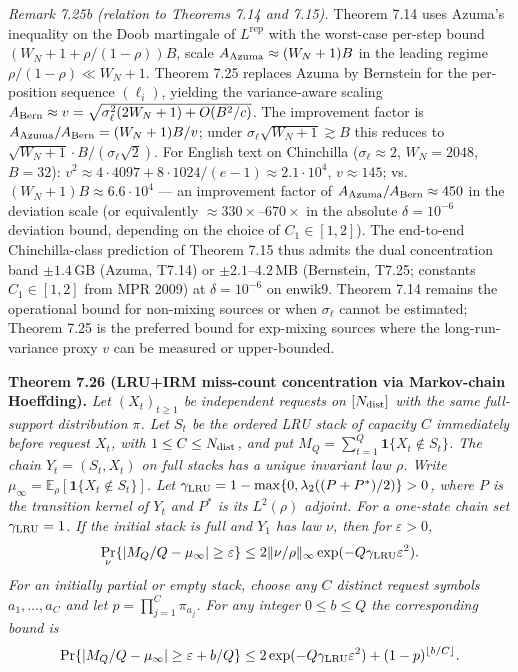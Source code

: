 \documentclass[
]{article}
\begin{document}
\emph{Remark 7.25b (relation to Theorems 7.14 and 7.15).}
Theorem 7.14 uses Azuma's inequality on the Doob martingale of
$L^{\mathrm{rep}}$ with the worst-case per-step bound
$(W_N + 1 + \rho/(1-\rho)) B$, scale $A_{\rm Azuma}
\approx (W_N+1) B$ in the leading regime $\rho/(1-\rho) \ll W_N + 1$.
Theorem 7.25 replaces Azuma by Bernstein for the per-position
sequence $(\ell_i)$, yielding the variance-aware scaling
$A_{\rm Bern} \approx v = \sqrt{\sigma_\ell^2 (2W_N+1)
+ O(B^2/c)}$. The improvement factor is
$A_{\rm Azuma}/A_{\rm Bern} = (W_N+1) B / v$; under
$\sigma_\ell \sqrt{W_N+1} \gtrsim B$ this reduces to $\sqrt{W_N+1}
\cdot B/(\sigma_\ell \sqrt{2})$. For English text on Chinchilla
($\sigma_\ell \approx 2$, $W_N = 2048$, $B = 32$): $v^2 \approx
4 \cdot 4097 + 8 \cdot 1024 / (e-1) \approx 2.1 \cdot 10^4$,
$v \approx 145$; vs.\ $(W_N+1) B \approx 6.6 \cdot 10^4$ --- an
improvement factor of $A_{\rm Azuma}/A_{\rm Bern} \approx 450$
in the deviation scale (or equivalently $\approx 330\times$--$670\times$
in the absolute $\delta = 10^{-6}$ deviation bound, depending on
the choice of $C_1 \in [1, 2]$). The end-to-end
Chinchilla-class prediction of Theorem 7.15 thus admits the dual
concentration band $\pm 1.4\,\mathrm{GB}$ (Azuma, T7.14) or
$\pm 2.1$--$4.2\,\mathrm{MB}$ (Bernstein, T7.25; constants
$C_1 \in [1,2]$ from MPR 2009) at $\delta = 10^{-6}$ on enwik9.
Theorem 7.14 remains the operational bound for non-mixing sources
or when $\sigma_\ell$ cannot be estimated;
Theorem 7.25 is the preferred bound for exp-mixing sources where
the long-run-variance proxy $v$ can be measured or upper-bounded.

\textbf{Theorem 7.26 (LRU+IRM miss-count concentration via
Markov-chain Hoeffding).} \emph{Let $(X_t)_{t\geq 1}$ be independent
requests on $[N_{\rm dist}]$ with the same full-support distribution
$\pi$. Let $S_t$ be the ordered LRU stack of capacity $C$ immediately
before request $X_t$, with $1\leq C\leq N_{\rm dist}$, and put
$M_Q=\sum_{t=1}^Q\mathbf{1}\{X_t\notin S_t\}$. The chain
$Y_t=(S_t,X_t)$ on full stacks has a unique invariant law $\rho$.
Write $\mu_\infty=\mathbb E_\rho[\mathbf{1}\{X_t\notin S_t\}]$.
Let $\gamma_{\rm LRU}=1-\max\{0,\lambda_2((P+P^*)/2)\}>0$,
where $P$ is the transition kernel of $Y_t$ and $P^*$ is its
$L^2(\rho)$ adjoint. For a one-state chain set $\gamma_{\rm LRU}=1$.
If the initial stack is full and $Y_1$ has law $\nu$, then for
$\varepsilon>0$,}
\[
  \Pr_\nu\{|M_Q/Q-\mu_\infty|\geq\varepsilon\}
  \leq 2\|\nu/\rho\|_\infty\exp(-Q\gamma_{\rm LRU}\varepsilon^2).
\]
\emph{For an initially partial or empty stack, choose any $C$ distinct
request symbols $a_1,\ldots,a_C$ and let $p=\prod_{j=1}^C\pi_{a_j}$.
For any integer $0\leq b\leq Q$ the corresponding bound is}
\[
  \Pr\{|M_Q/Q-\mu_\infty|\geq\varepsilon+b/Q\}
  \leq 2\exp(-Q\gamma_{\rm LRU}\varepsilon^2)+(1-p)^{\lfloor b/C\rfloor}.
\]
\end{document}
